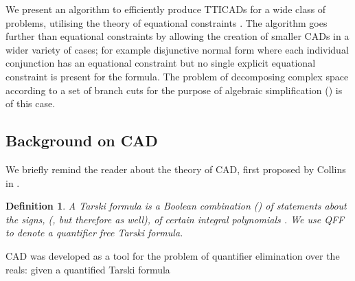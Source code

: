 \documentclass{article}
\newtheorem{definition}{Definition}
\begin{document}
We present an algorithm to efficiently produce TTICADs for a wide class of problems, utilising the theory of equational constraints \cite{McCallum1999a}.  The algorithm goes further than equational constraints by allowing the creation of smaller CADs in a wider variety of cases; for example disjunctive normal form where each individual conjunction has an equational constraint but no single explicit equational constraint is present for the formula.  The problem of decomposing complex space according to a set of branch cuts for the purpose of algebraic simplification (\cite[etc.]{Phisanbutetal2010a}) is of this case.  

\subsection{Background on CAD}

We briefly remind the reader about the theory of CAD, first proposed by Collins in \cite{Collins1975}.
\begin{definition}
A {\em Tarski formula\/}  is a Bool\-ean combination () of statements about the signs, (, but therefore  as well), of certain integral polynomials .  We use {\em QFF} to denote a quantifier free Tarski formula.
\end{definition}
CAD was developed as a tool for the problem of quantifier elimination over the reals: given a quantified Tarski formula
\end{document}
